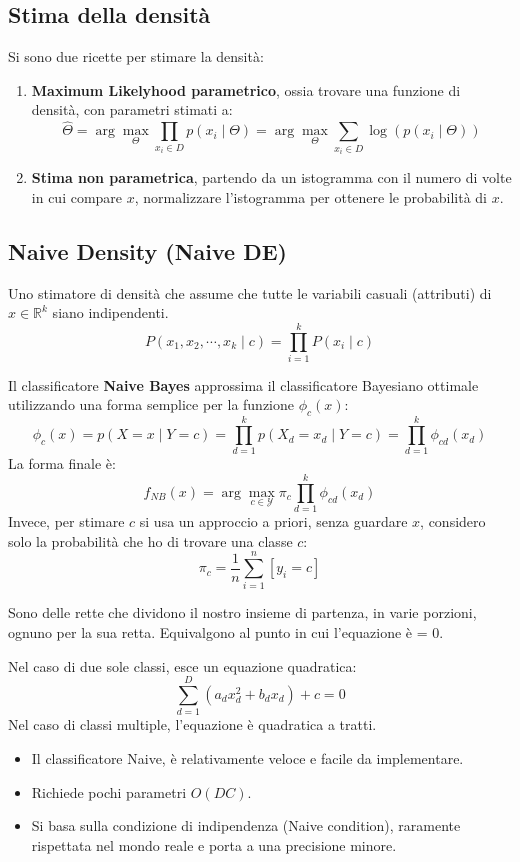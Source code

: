 \subsection{Stima della densità}
Si sono due ricette per stimare la densità:
\begin{enumerate}
  \item \textbf{Maximum Likelyhood parametrico}, ossia trovare una funzione di densità, con parametri stimati a:
  \[
    \hat{\Theta} = \arg\max_{\Theta} \prod_{x_i \in D} p(x_i \mid \Theta) = \arg\max_{\Theta} \sum_{x_i \in D} \log(p(x_i \mid \Theta))
  \]
  \item \textbf{Stima non parametrica}, partendo da un istogramma con il numero di volte in cui compare $x$, normalizzare l’istogramma per ottenere le probabilità di $x$. 
\end{enumerate}

\subsection{Naive Density (Naive DE)}
\begin{defn}
  Uno stimatore di densità che assume che tutte le variabili casuali (attributi) di $x \in \mathbb{R}^k$ siano indipendenti.
  \[
    P(x_1, x_2, \cdots, x_k \mid c) = \prod_{i=1}^k{P(x_i \mid c)}
  \]
\end{defn}

Il classificatore \textbf{Naive Bayes} approssima il classificatore Bayesiano ottimale utilizzando una forma semplice per la funzione $\phi_c(x)$:
\[
  \phi_c(x) = p(X = x \mid Y = c) = \prod_{d=1}^{k} p(X_d = x_d \mid Y = c) = \prod_{d=1}^{k} \phi_{cd}(x_d)
\]
La forma finale è:
\[
  f_{NB}(x) = \arg\max_{c \in \mathcal{Y}} \pi_c \prod_{d=1}^{k} \phi_{cd}(x_d)
\]
Invece, per stimare $c$ si usa un approccio a priori, senza guardare $x$, considero solo la probabilità che ho di trovare una classe $c$:
\[
  \pi_c = \frac{1}{n} \sum_{i=1}^n{[y_i = c]}
\]
\begin{defn}
  Sono delle rette che dividono il nostro insieme di partenza, in varie porzioni, ognuno per la sua retta. Equivalgono al punto in cui l’equazione è = 0. 
\end{defn}
Nel caso di due sole classi, esce un equazione quadratica:
\[
  \sum_{d=1}^D{(a_d x_d^2 + b_d x_d) + c} = 0
\]
Nel caso di classi multiple, l'equazione è quadratica a tratti.

\begin{note}
  \begin{itemize}
    \item Il classificatore Naive, è relativamente veloce e facile da implementare.
    \item Richiede pochi parametri $O(DC)$.
    \item Si basa sulla condizione di indipendenza (Naive condition), raramente rispettata nel mondo reale e porta a una precisione minore.
  \end{itemize}
\end{note}


